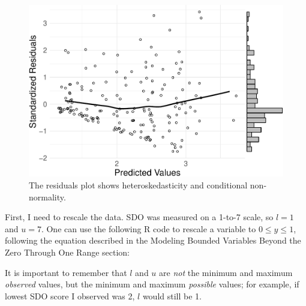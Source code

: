 \documentclass[english,man]{apa6}
\newenvironment{Shaded}{\begin{snugshade}}{\end{snugshade}}
\newcommand{\DecValTok}[1]{\textcolor[rgb]{0.00,0.00,0.81}{#1}}
\newcommand{\StringTok}[1]{\textcolor[rgb]{0.31,0.60,0.02}{#1}}
\newcommand{\OperatorTok}[1]{\textcolor[rgb]{0.81,0.36,0.00}{\textbf{#1}}}
\newcommand{\NormalTok}[1]{#1}
\theoremstyle{definition}
\theoremstyle{definition}
\theoremstyle{remark}
\begin{document}
\begin{figure}
\centering
\includegraphics{beta_hurdle_files/figure-latex/unnamed-chunk-12-1.pdf}
\caption{\label{fig:unnamed-chunk-12}The residuals plot shows
heteroskedasticity and conditional non-normality.}
\end{figure}

First, I need to rescale the data. SDO was measured on a 1-to-7 scale,
so \(l = 1\) and \(u = 7\). One can use the following R code to rescale
a variable to \(0 \leq y \leq 1\), following the equation described in
the Modeling Bounded Variables Beyond the Zero Through One Range
section:

\begin{Shaded}
\end{Shaded}

It is important to remember that \(l\) and \(u\) are \emph{not} the
minimum and maximum \emph{observed} values, but the minimum and maximum
\emph{possible} values; for example, if lowest SDO score I observed was
2, \(l\) would still be 1.
\end{document}
